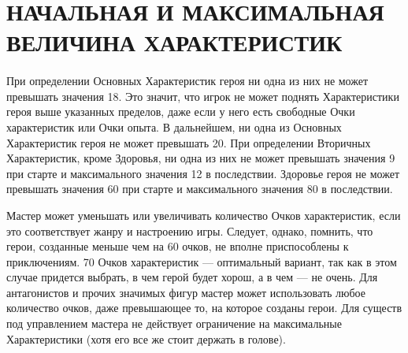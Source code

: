 \section{НАЧАЛЬНАЯ И МАКСИМАЛЬНАЯ ВЕЛИЧИНА ХАРАКТЕРИСТИК}
\paragraph{}
{\color{orange}При определении Основных Характеристик героя ни одна из них не может превышать значения 18. Это значит, что игрок не может поднять Характеристики героя выше указанных пределов, даже если у него есть свободные Очки характеристик или Очки опыта. В дальнейшем, ни одна из Основных Характеристик героя не может превышать 20. 
\newline
При определении Вторичных Характеристик, кроме Здоровья, ни одна из них не может превышать значения 9 при старте и максимального значения 12 в последствии.
\newline
Здоровье героя не может превышать значения 60 при старте и максимального значения 80 в последствии.}

Мастер может уменьшать или увеличивать количество Очков характеристик, если это соответствует жанру и настроению игры. Следует, однако, помнить, что герои, созданные меньше чем на 60 очков, не вполне приспособлены к приключениям. 70 Очков характеристик — оптимальный вариант, так как в этом случае придется выбрать, в чем герой будет хорош, а в чем — не очень.
\newline
Для антагонистов и прочих значимых фигур мастер может использовать любое количество очков, даже превышающее то, на которое созданы герои. Для существ под управлением мастера не действует ограничение на максимальные Характеристики (хотя его все же стоит держать в голове).

